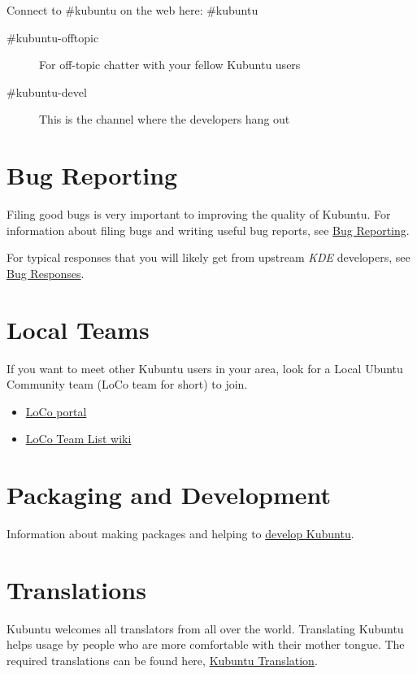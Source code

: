 \documentclass[letterpaper,10pt,english]{sphinxmanual}
\begin{document}
Connect to \#kubuntu on the web here: \#kubuntu
\begin{description}
\item[{\#kubuntu-offtopic}] \leavevmode
For off-topic chatter with your fellow Kubuntu users

\item[{\#kubuntu-devel}] \leavevmode
This is the channel where the developers hang out

\end{description}


\section{Bug Reporting}
\label{docs/contribute:bug-reporting}
Filing good bugs is very important to improving the quality of Kubuntu. For information about filing bugs and writing useful bug reports, see \href{https://wiki.kubuntu.org/Kubuntu/Bugs/Reporting}{Bug Reporting}.

For typical responses that you will likely get from upstream \emph{KDE} developers, see \href{https://community.kde.org/Kubuntu/BugTriage}{Bug Responses}.


\section{Local Teams}
\label{docs/contribute:local-teams}
If you want to meet other Kubuntu users in your area, look for a Local Ubuntu Community team (LoCo team for short) to join.
\begin{itemize}
\item {} 
\href{http://loco.ubuntu.com/}{LoCo portal}

\item {} 
\href{https://wiki.ubuntu.com/LoCoTeams}{LoCo Team List wiki}

\end{itemize}


\section{Packaging and Development}
\label{docs/contribute:packaging-and-development}
Information about making packages and helping to \href{https://wiki.kubuntu.org/Kubuntu/GettingInvolved/Development}{develop Kubuntu}.


\section{Translations}
\label{docs/contribute:translations}
Kubuntu welcomes all translators from all over the world. Translating Kubuntu helps usage by people who are more comfortable with their mother tongue. The required translations can be found here, \href{https://community.kde.org/Kubuntu/Translation}{Kubuntu Translation}.
\end{document}
